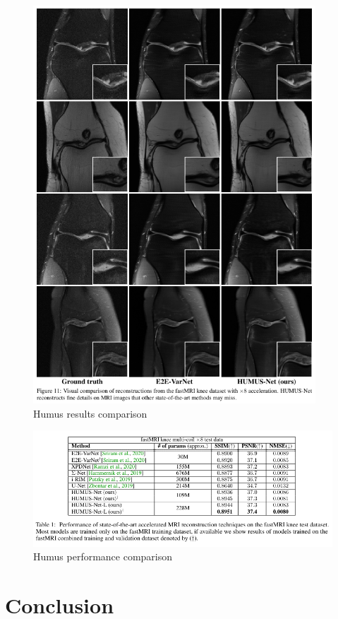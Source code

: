 \documentclass[10pt,a4paper]{article}
\begin{document}
\begin{figure}[H]
\centering
\includegraphics[width=300pt]{./images/humus-comparison.png}
\caption{Humus results comparison}
\end{figure}

\begin{figure}[H]
\centering
\includegraphics[width=400pt]{./images/humus-perf.png}
\caption{Humus performance comparison}
\end{figure}

\section{Conclusion}
\end{document}
